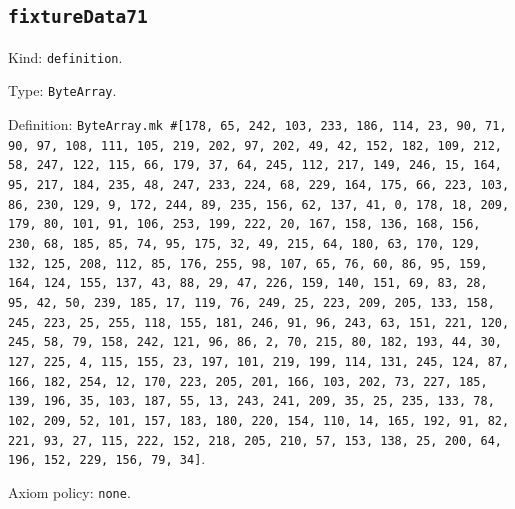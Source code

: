 \documentclass[11pt]{article}
\begin{document}
\subsection*{\texttt{fixtureData71}}
\noindent Kind: \texttt{definition}.\par
\noindent Type: \texttt{ByteArray}.\par
\noindent Definition: \texttt{ByteArray.mk \#[178, 65, 242, 103, 233, 186, 114, 23, 90, 71, 90, 97, 108, 111, 105, 219, 202, 97, 202, 49, 42, 152, 182, 109, 212, 58, 247, 122, 115, 66, 179, 37, 64, 245, 112, 217, 149, 246, 15, 164, 95, 217, 184, 235, 48, 247, 233, 224, 68, 229, 164, 175, 66, 223, 103, 86, 230, 129, 9, 172, 244, 89, 235, 156, 62, 137, 41, 0, 178, 18, 209, 179, 80, 101, 91, 106, 253, 199, 222, 20, 167, 158, 136, 168, 156, 230, 68, 185, 85, 74, 95, 175, 32, 49, 215, 64, 180, 63, 170, 129, 132, 125, 208, 112, 85, 176, 255, 98, 107, 65, 76, 60, 86, 95, 159, 164, 124, 155, 137, 43, 88, 29, 47, 226, 159, 140, 151, 69, 83, 28, 95, 42, 50, 239, 185, 17, 119, 76, 249, 25, 223, 209, 205, 133, 158, 245, 223, 25, 255, 118, 155, 181, 246, 91, 96, 243, 63, 151, 221, 120, 245, 58, 79, 158, 242, 121, 96, 86, 2, 70, 215, 80, 182, 193, 44, 30, 127, 225, 4, 115, 155, 23, 197, 101, 219, 199, 114, 131, 245, 124, 87, 166, 182, 254, 12, 170, 223, 205, 201, 166, 103, 202, 73, 227, 185, 139, 196, 35, 103, 187, 55, 13, 243, 241, 209, 35, 25, 235, 133, 78, 102, 209, 52, 101, 157, 183, 180, 220, 154, 110, 14, 165, 192, 91, 82, 221, 93, 27, 115, 222, 152, 218, 205, 210, 57, 153, 138, 25, 200, 64, 196, 152, 229, 156, 79, 34]}.\par
\noindent Axiom policy: \texttt{none}.\par
\end{document}
